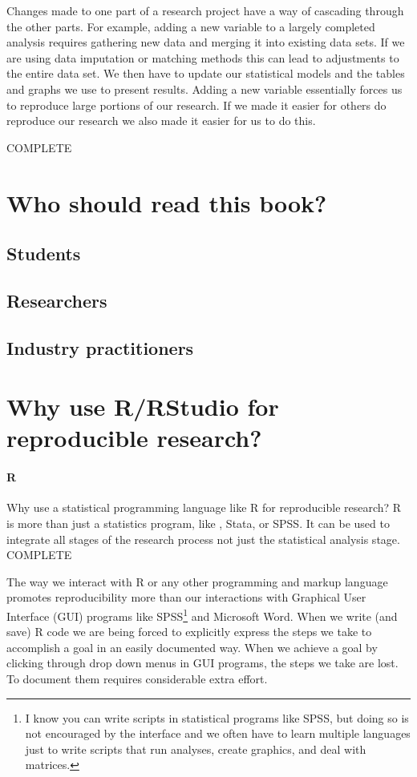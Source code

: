 \documentclass[ChapterTOCs,krantz1]{krantz}\usepackage{graphicx, color}
\begin{document}
Changes made to one part of a research project have a way of cascading through the other parts. For example, adding a new variable to a largely completed analysis requires gathering new data and merging it into existing data sets. If we are using data imputation or matching methods this can lead to adjustments to the entire data set. We then have to update our statistical models and the tables and graphs we use to present results. Adding a new variable essentially forces us to reproduce large portions of our research. If we made it easier for others do reproduce our research we also made it easier for us to do this. 

COMPLETE

\section{Who should read this book?}

\subsection{Students}

\subsection{Researchers}

\subsection{Industry practitioners}

\section{Why use R/RStudio for reproducible research?}

\paragraph{R}
Why use a statistical programming language like R for reproducible research? R is more than just a statistics program, like , Stata, or SPSS. It can be used to integrate all stages of the research process not just the statistical analysis stage. COMPLETE

The way we interact with R or any other programming and markup language promotes reproducibility more than our interactions with Graphical User Interface (GUI) programs like SPSS\footnote{I know you can write scripts in statistical programs like SPSS, but doing so is not encouraged by the interface and we often have to learn multiple languages just to write scripts that run analyses, create graphics, and deal with matrices.} and Microsoft Word. When we write (and save) R code we are being forced to explicitly express the steps we take to accomplish a goal in an easily documented way. When we achieve a goal by clicking through drop down menus in GUI programs, the steps we take are lost. To document them requires considerable extra effort.
\end{document}
